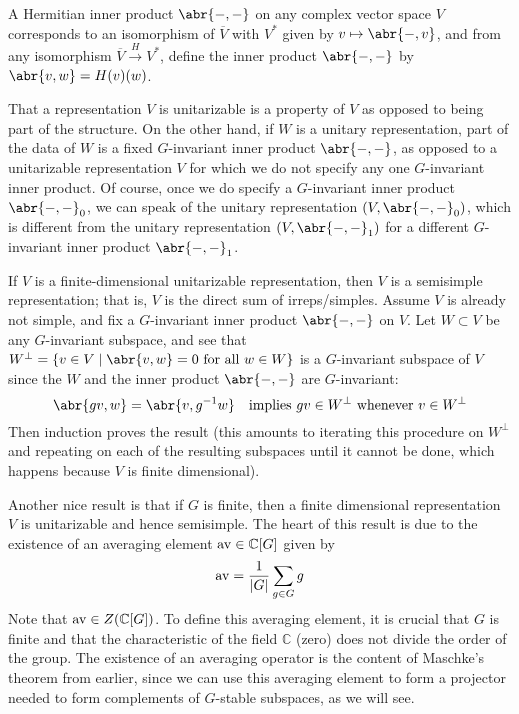 \documentclass[../../rtnotes.tex]{subfiles}
\begin{document}
A Hermitian inner product $\abr{-,-}$ on any complex vector space $V$ corresponds to an isomorphism of $\overline V$ with $V^\ast$ given by $v\mapsto \abr{-,v}$, and from any isomorphism $\overline V\xrightarrow{H} V^\ast$, define the inner product $\abr{-,-}$ by $\abr{v,w} = H(v)(w)$.

That a representation $V$ is unitarizable is a property of $V$ as opposed to being part of the structure. On the other hand, if $W$ is a unitary representation, part of the data of $W$ is a fixed $G$-invariant inner product $\abr{-,-}$, as opposed to a unitarizable representation $V$ for which we do not specify any one $G$-invariant inner product. Of course, once we do specify a $G$-invariant inner product $\abr{-,-}_0$, we can speak of the unitary representation $(V,\abr{-,-}_0)$, which is different from the unitary representation $(V,\abr{-,-}_1)$ for a different $G$-invariant inner product $\abr{-,-}_1$.

If $V$ is a finite-dimensional unitarizable representation, then $V$ is a semisimple representation; that is, $V$ is the direct sum of irreps/simples. Assume $V$ is already not simple, and fix a $G$-invariant inner product $\abr{-,-}$ on $V$. Let $W\subset V$ be any $G$-invariant subspace, and see that $W^\perp = \{v\in V\mid \abr{v,w} = 0\text{ for all }w\in W\}$ is a $G$-invariant subspace of $V$ since the $W$ and the inner product $\abr{-,-}$ are $G$-invariant:
\[\abr{gv,w} = \abr{v,g^{-1}w}\quad\text{implies $gv\in W^\perp$ whenever $v\in W^\perp$}\]
Then induction proves the result (this amounts to iterating this procedure on $W^\perp$ and repeating on each of the resulting subspaces until it cannot be done, which happens because $V$ is finite dimensional).

Another nice result is that if $G$ is finite, then a finite dimensional representation $V$ is unitarizable and hence semisimple. The heart of this result is due to the existence of an averaging element $\mathrm{av}\in\mathbb C[G]$ given by
\[\mathrm{av} = \frac{1}{\abs{G}}\sum_{g\in G}g\]
Note that $\mathrm{av}\in Z(\mathbb C[G])$. To define this averaging element, it is crucial that $G$ is finite and that the characteristic of the field $\mathbb C$ (zero) does not divide the order of the group. The existence of an averaging operator is the content of Maschke's theorem from earlier, since we can use this averaging element to form a projector needed to form complements of $G$-stable subspaces, as we will see. 
\end{document}
